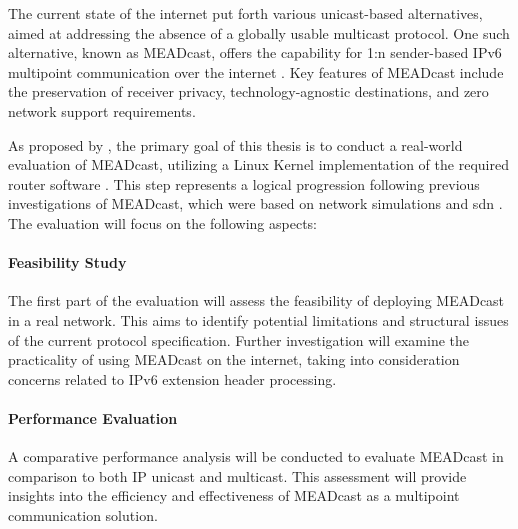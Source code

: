 

The current state of the internet put forth various unicast-based alternatives,
    aimed at addressing the absence of a globally usable multicast protocol.
One such alternative, known as MEADcast, offers the capability for 1:n
    sender-based IPv6 multipoint communication over the internet
    \cite{meadcast1, meadcast2}.
Key features of MEADcast include the preservation of receiver privacy,
    technology-agnostic destinations, and zero network support requirements.

As proposed by \citeauthor{meadcast2}, the primary goal of this thesis is to
    conduct a real-world evaluation of MEADcast, utilizing a Linux Kernel
    implementation of the required router software \cite{meadcast2}.
This step represents a logical progression following previous investigations of
    MEADcast, which were based on network simulations \cite{meadcast1} and
    \gls{sdn} \cite{sdn_ba}.
The evaluation will focus on the following aspects:

\paragraph{Feasibility Study} %
\label{par:Feasibility Study}
The first part of the evaluation will assess the feasibility of deploying
    MEADcast in a real network.
This aims to identify potential limitations and structural issues of the
    current protocol specification.
Further investigation will examine the practicality of using MEADcast on the
    internet, taking into consideration concerns related to IPv6 extension
    header processing.

\paragraph{Performance Evaluation} %
\label{par:Performance Evaluation}
A comparative performance analysis will be conducted to evaluate MEADcast in
    comparison to both IP unicast and multicast.
This assessment will provide insights into the efficiency and effectiveness of
    MEADcast as a multipoint communication solution.

